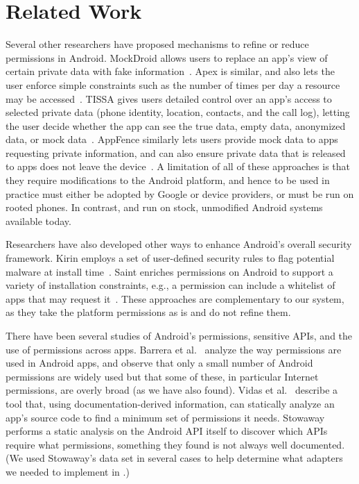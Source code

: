 
\section{Related Work}

Several other researchers have proposed mechanisms to refine or reduce
permissions in Android. MockDroid allows users to replace an
app's view of certain private data with fake
information~\cite{mockdroid}. Apex is similar, and also lets 
the user enforce simple constraints such as the
number of times per day a resource may be accessed~\cite{apex}. TISSA
gives users detailed control over an app's access to selected private data
(phone identity, location, contacts, and the call log), letting the
user decide whether the app can see the true data, empty data,
anonymized data, or mock data~\cite{zhou2011taming}. AppFence
similarly lets users provide mock data to apps requesting private
information, and can also ensure private data that is released to apps
does not leave the device~\cite{Hornyack:2011:TAD:2046707.2046780}.  A
limitation of all of these approaches is that they require
modifications to the Android platform, and hence to be used in
practice must either be
adopted by Google or device providers, or must be run on rooted
phones. In contrast, \rewriter and \lib run on stock, unmodified
Android systems available today.

Researchers have also developed other ways to enhance Android's
overall security framework. Kirin employs a set of user-defined
security rules to flag potential malware at install
time~\cite{enck2009lightweight}. Saint enriches permissions on Android
to support a variety of installation constraints, e.g., a permission
can include a whitelist of apps that may request
it~\cite{ongtang2009semantically}. These approaches are complementary
to our system, as they take the platform permissions as is and do not
refine them.

There have been several studies of Android's permissions, sensitive
APIs, and the use of permissions across apps.  Barrera et
al.~\cite{barrera2010methodology} analyze the way permissions are used
in Android apps, and observe that only a small number of Android
permissions are widely used but that some of these, in particular
Internet permissions, are overly broad (as we have also found). Vidas
et al.~\cite{vidas:w2sp11} describe a tool that, using
documentation-derived information, can statically analyze an app's
source code to find a minimum set of permissions it
needs. Stowaway~\cite{felt:ccs11} performs a static analysis on the
Android API itself to discover which APIs require what permissions,
something they found is not always well documented. (We used
Stowaway's data set in several cases to help determine what adapters
we needed to implement in \lib.)

